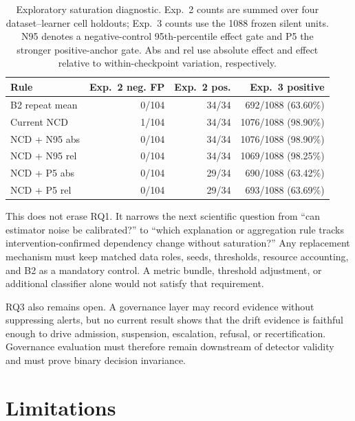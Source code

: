 \documentclass[10pt]{article}
\newcommand{\ncd}{\textsc{NCD}}
\begin{document}
\begin{table}[t]
\centering
\caption{Exploratory saturation diagnostic.  Exp.~2 counts are summed over
four dataset--learner cell holdouts; Exp.~3 counts use the 1088 frozen silent
units.  N95 denotes a negative-control 95th-percentile effect gate and P5 the
stronger positive-anchor gate.  Abs and rel use absolute effect and effect
relative to within-checkpoint variation, respectively.}
\label{tab:saturation-diagnostic}
\begin{tabular}{@{}lrrr@{}}
\toprule
Rule & Exp.~2 neg. FP & Exp.~2 pos. & Exp.~3 positive \\
\midrule
B2 repeat mean & 0/104 & 34/34 & 692/1088 (63.60\%) \\
Current \ncd{} & 1/104 & 34/34 & 1076/1088 (98.90\%) \\
\ncd{} + N95 abs & 0/104 & 34/34 & 1076/1088 (98.90\%) \\
\ncd{} + N95 rel & 0/104 & 34/34 & 1069/1088 (98.25\%) \\
\ncd{} + P5 abs & 0/104 & 29/34 & 690/1088 (63.42\%) \\
\ncd{} + P5 rel & 0/104 & 29/34 & 693/1088 (63.69\%) \\
\bottomrule
\end{tabular}
\end{table}

This does not erase RQ1.  It narrows the next scientific question from
``can estimator noise be calibrated?'' to ``which explanation or aggregation
rule tracks intervention-confirmed dependency change without saturation?''
Any replacement mechanism must keep matched data roles, seeds, thresholds,
resource accounting, and B2 as a mandatory control.  A metric bundle,
threshold adjustment, or additional classifier alone would not satisfy that
requirement.

RQ3 also remains open.  A governance layer may record evidence without
suppressing alerts, but no current result shows that the drift evidence is
faithful enough to drive admission, suspension, escalation, refusal, or
recertification.  Governance evaluation must therefore remain downstream of
detector validity and must prove binary decision invariance.

\section{Limitations}
\end{document}
